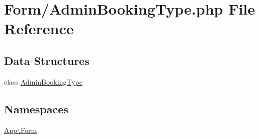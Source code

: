 \hypertarget{_admin_booking_type_8php}{}\section{Form/\+Admin\+Booking\+Type.php File Reference}
\label{_admin_booking_type_8php}
\subsection*{Data Structures}
\begin{DoxyCompactItemize}
\item 
class \mbox{\hyperlink{class_app_1_1_form_1_1_admin_booking_type}{Admin\+Booking\+Type}}
\end{DoxyCompactItemize}
\subsection*{Namespaces}
\begin{DoxyCompactItemize}
\item 
 \mbox{\hyperlink{namespace_app_1_1_form}{App\textbackslash{}\+Form}}
\end{DoxyCompactItemize}
